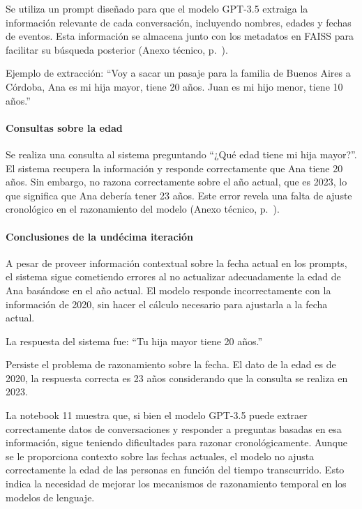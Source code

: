 Se utiliza un prompt diseñado para que el modelo GPT-3.5 extraiga la información relevante de cada conversación, incluyendo nombres, edades y fechas de eventos. Esta información se almacena junto con los metadatos en FAISS para facilitar su búsqueda posterior (Anexo técnico, p.~\pageref{anexo:code-4-1-11-3}).

Ejemplo de extracción:
``Voy a sacar un pasaje para la familia de Buenos Aires a Córdoba, Ana es mi hija mayor, tiene 20 años. Juan es mi hijo menor, tiene 10 años.''

\paragraph{Consultas sobre la edad}

Se realiza una consulta al sistema preguntando ``¿Qué edad tiene mi hija mayor?''. El sistema recupera la información y responde correctamente que Ana tiene 20 años. Sin embargo, no razona correctamente sobre el año actual, que es 2023, lo que significa que Ana debería tener 23 años. Este error revela una falta de ajuste cronológico en el razonamiento del modelo (Anexo técnico, p.~\pageref{anexo:code-4-1-11-4}).

\paragraph{Conclusiones de la undécima iteración}

A pesar de proveer información contextual sobre la fecha actual en los prompts, el sistema sigue cometiendo errores al no actualizar adecuadamente la edad de Ana basándose en el año actual. El modelo responde incorrectamente con la información de 2020, sin hacer el cálculo necesario para ajustarla a la fecha actual.

La respuesta del sistema fue: ``Tu hija mayor tiene 20 años.''

Persiste el problema de razonamiento sobre la fecha. El dato de la edad es de 2020, la respuesta correcta es 23 años considerando que la consulta se realiza en 2023.

La notebook 11 muestra que, si bien el modelo GPT-3.5 puede extraer correctamente datos de conversaciones y responder a preguntas basadas en esa información, sigue teniendo dificultades para razonar cronológicamente. Aunque se le proporciona contexto sobre las fechas actuales, el modelo no ajusta correctamente la edad de las personas en función del tiempo transcurrido. Esto indica la necesidad de mejorar los mecanismos de razonamiento temporal en los modelos de lenguaje.
